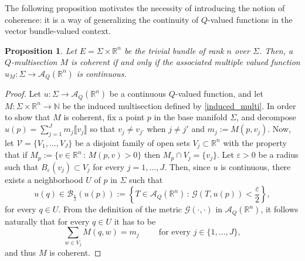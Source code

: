 \documentclass[a4paper,11pt,reqno]{amsart}
\newtheorem{proposition}[theorem]{Proposition}
\theoremstyle{definition}
\numberwithin{equation}{section}
\numberwithin{subsection}{section}
\newcommand{\N}{\mathbb{N}}
\newcommand{\R}{\mathbb{R}}
\newcommand{\A}{\mathcal{A}}
\newcommand{\B}{\mathcal{B}}
\newcommand{\G}{\mathcal{G}}
\begin{document}
The following proposition motivates the necessity of introducing the notion of coherence: it is a way of generalizing the continuity of $Q$-valued functions in the vector bundle-valued context.

\begin{proposition} \label{continuity:prop}
Let $E = \Sigma \times \R^{n}$ be the trivial bundle of rank $n$ over $\Sigma$. Then, a $Q$-multisection $M$ is coherent if and only if the associated multiple valued function ${u_{M} \colon \Sigma \to \A_{Q}(\R^{n})}$ is continuous.
\end{proposition}

\begin{proof}
Let $u \colon \Sigma \to \A_{Q}(\R^n)$ be a continuous $Q$-valued function, and let $M \colon \Sigma \times \R^{n} \to \N$ be the induced multisection defined by \eqref{induced_multi}. In order to show that $M$ is coherent, fix a point $p$ in the base manifold $\Sigma$, and decompose $u(p) = \sum_{j=1}^{J} m_{j} \llbracket v_{j} \rrbracket$ so that $v_{j} \neq v_{j'}$ when $j \neq j'$ and $m_{j} := M(p,v_j)$. Now, let $\mathcal{V} = \{V_{1}, \dots, V_{J} \}$ be a disjoint family of open sets $V_{j} \subset \R^{n}$ with the property that if $M_{p} := \lbrace v \in \R^n \, \colon \, M(p,v) > 0 \rbrace$ then $M_{p} \cap V_{j} = \{v_{j}\}$. Let $\varepsilon > 0$ be a radius such that $B_{\varepsilon}(v_j) \subset V_j$ for every $j = 1,\dots,J$. Then, since $u$ is continuous, there exists a neighborhood $U$ of $p$ in $\Sigma$ such that 
\[
u(q) \in \B_{\frac{\varepsilon}{2}}(u(p)) := \left\lbrace T \in \A_{Q}(\R^n) \, \colon \, \G(T, u(p)) < \frac{\varepsilon}{2} \right\rbrace, 
\]
for every $q \in U$. From the definition of the metric $\G(\cdot, \cdot)$ in $\A_{Q}(\R^{n})$, it follows naturally that for every $q \in U$ it has to be
\[
\sum_{w \in V_{j}} M(q,w) = m_{j} \hspace{1cm} \mbox{for every } j \in \{1,\dots,J\},
\]
and thus $M$ is coherent.


\end{proof}
\end{document}
